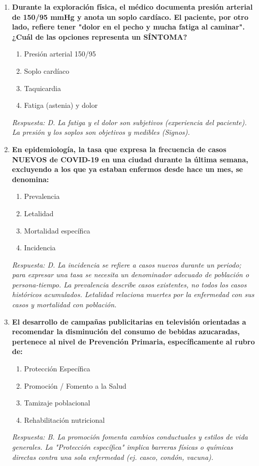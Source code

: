 \begin{enumerate}[label=\textbf{\arabic*.}]
    \item \textbf{Durante la exploración física, el médico documenta presión arterial de 150/95 mmHg y anota un soplo cardíaco. El paciente, por otro lado, refiere tener "dolor en el pecho y mucha fatiga al caminar". ¿Cuál de las opciones representa un SÍNTOMA?}
    \begin{enumerate}
        \item[A)] Presión arterial 150/95
        \item[B)] Soplo cardíaco
        \item[C)] Taquicardia
        \item[D)] Fatiga (astenia) y dolor
    \end{enumerate}
    \textit{Respuesta: D. La fatiga y el dolor son subjetivos (experiencia del paciente). La presión y los soplos son objetivos y medibles (Signos).}

    \item \textbf{En epidemiología, la tasa que expresa la frecuencia de casos NUEVOS de COVID-19 en una ciudad durante la última semana, excluyendo a los que ya estaban enfermos desde hace un mes, se denomina:}
    \begin{enumerate}
        \item[A)] Prevalencia
        \item[B)] Letalidad
        \item[C)] Mortalidad específica
        \item[D)] Incidencia
    \end{enumerate}
    \textit{Respuesta: D. La incidencia se refiere a casos nuevos durante un periodo; para expresar una tasa se necesita un denominador adecuado de población o persona-tiempo. La prevalencia describe casos existentes, no todos los casos históricos acumulados. Letalidad relaciona muertes por la enfermedad con sus casos y mortalidad con población.}

    \item \textbf{El desarrollo de campañas publicitarias en televisión orientadas a recomendar la disminución del consumo de bebidas azucaradas, pertenece al nivel de Prevención Primaria, específicamente al rubro de:}
    \begin{enumerate}
        \item[A)] Protección Específica
        \item[B)] Promoción / Fomento a la Salud
        \item[C)] Tamizaje poblacional
        \item[D)] Rehabilitación nutricional
    \end{enumerate}
    \textit{Respuesta: B. La promoción fomenta cambios conductuales y estilos de vida generales. La "Protección específica" implica barreras físicas o químicas directas contra una sola enfermedad (ej. casco, condón, vacuna).}


\end{enumerate}
